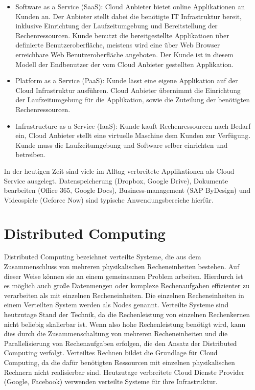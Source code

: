 \begin{itemize}
	\item Software as a Service (SaaS): Cloud Anbieter bietet online Applikationen an Kunden an. Der Anbieter stellt dabei die benötigte IT Infrastruktur bereit, inklusive Einrichtung der Laufzeitumgebung und Bereitstellung der Rechenressourcen. Kunde benutzt die bereitgestellte Applikatioen über definierte Benutzeroberfläche, meistens wird eine über Web Browser erreichbare Web Benutzeroberfläche angeboten. Der Kunde ist in diesem Modell der Endbenutzer der vom Cloud Anbieter gestellten Applikation.
	\item Platform as a Service (PaaS): Kunde lässt eine eigene Applikation auf der Cloud Infrastruktur ausführen. Cloud Anbieter übernimmt die Einrichtung der Laufzeitumgebung für die Applikation, sowie die Zuteilung der benötigten Rechenressourcen. 
	\item Infrastructure as a Service (IaaS): Kunde kauft Rechenressourcen nach Bedarf ein, Cloud Anbieter stellt eine \gls{virtuelle Maschine} dem Kunden zur Verfügung. Kunde muss die Laufzeitumgebung und Software selber einrichten und betreiben. 
\end{itemize} \cite{Mell2011}

In der heutigen Zeit sind viele im Alltag verbreitete Applikationen als Cloud Service ausgelegt. Datenspeicherung (Dropbox, Google Drive), Dokumente bearbeiten (Office 365, Google Docs), Business-management (SAP ByDesign) und Videospiele (Geforce Now) sind typische Anwendungsbereiche hierfür. 

\section{Distributed Computing}

Distributed Computing bezeichnet verteilte Systeme, die aus dem Zusammenschluss von mehreren physikalischen Recheneinheiten bestehen. Auf dieser Weise können sie an einem gemeinsamen Problem arbeiten. Hierdurch ist es möglich auch große Datenmengen oder komplexe Rechenaufgaben effizienter zu verarbeiten als mit einzelnen Recheneinheiten. \cite{AWS2023} Die einzelnen Recheneinheiten in einem Verteilten System werden als Nodes genannt. \cite{ord1994scale} Verteilte Systeme sind heutzutage Stand der Technik, da die Rechenleistung von einzelnen Rechenkernen nicht beliebig skalierbar ist. Wenn also hohe Rechenleistung benötigt wird, kann dies  durch die Zusammenschaltung von mehreren Recheneinheiten und die Parallelisierung von Rechenaufgaben erfolgen, die den Ansatz der Distributed Computing verfolgt. Verteiltes Rechnen bildet die Grundlage für Cloud Computing, da die dafür benötigten Ressourcen mit einzelnen physikalischen Rechnern nicht realisierbar sind. Heutzutage verbreitete Cloud Dienste Provider (Google, Facebook) verwenden verteilte Systeme für ihre Infrastruktur. \cite{arpaci2018operating} 

